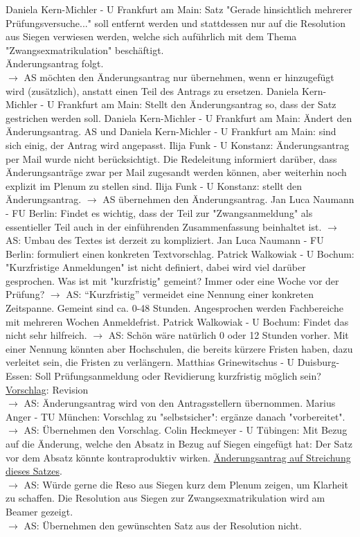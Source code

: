     \begin{outline}
      \1 Daniela Kern-Michler - U Frankfurt am Main:  Satz "Gerade hinsichtlich mehrerer Prüfungsversuche..." soll entfernt werden und stattdessen nur auf die Resolution aus Siegen verwiesen werden, welche sich auführlich mit dem Thema "Zwangsexmatrikulation" beschäftigt. \\ Änderungsantrag folgt. \\
      $\rightarrow$ AS möchten den Änderungsantrag nur übernehmen, wenn er hinzugefügt wird (zusätzlich), anstatt einen Teil des Antrags zu ersetzen.
        \2 Daniela Kern-Michler - U Frankfurt am Main:  Stellt den Änderungsantrag so, dass der Satz gestrichen werden soll.
        \2 Daniela Kern-Michler - U Frankfurt am Main:  Ändert den Änderungsantrag. AS und Daniela Kern-Michler - U Frankfurt am Main:  sind sich einig, der Antrag wird angepasst.
      \1 Ilija Funk - U Konstanz:  Änderungsantrag per Mail wurde nicht berücksichtigt.
        \2 Die Redeleitung informiert darüber, dass Änderungsanträge zwar per Mail zugesandt werden können, aber weiterhin noch explizit im Plenum zu stellen sind.
      \1 Ilija Funk - U Konstanz:  stellt den Änderungsantrag. $\rightarrow$ AS übernehmen den Änderungsantrag.
      \1 Jan Luca Naumann - FU Berlin:  Findet es wichtig, dass der Teil zur "Zwangsanmeldung" als essentieller Teil auch in der einführenden Zusammenfassung beinhaltet ist.
        $\rightarrow$ AS: Umbau des Textes ist derzeit zu kompliziert.
        \2 Jan Luca Naumann - FU Berlin:  formuliert einen konkreten Textvorschlag.
      \1 Patrick Walkowiak - U Bochum:  "Kurzfristige Anmeldungen" ist nicht definiert, dabei wird viel darüber gesprochen. Was ist mit "kurzfristig" gemeint? Immer oder eine Woche vor der Prüfung? $\rightarrow$ AS: ``Kurzfristig'' vermeidet eine Nennung einer konkreten Zeitspanne. Gemeint sind ca. 0-48 Stunden. Angesprochen werden Fachbereiche mit mehreren Wochen Anmeldefrist.
        \2 Patrick Walkowiak - U Bochum:  Findet das nicht sehr hilfreich.
          $\rightarrow$ AS: Schön wäre natürlich 0 oder 12 Stunden vorher. Mit einer Nennung könnten aber Hochschulen, die bereits kürzere Fristen haben, dazu verleitet sein, die Fristen zu verlängern.
      \1 Matthias Grinewitschus - U Duisburg-Essen:  Soll Prüfungsanmeldung oder Revidierung kurzfristig möglich sein? \uline{Vorschlag}: Revision \\
        $\rightarrow$ AS: Änderungsantrag wird von den Antragsstellern übernommen.
      \1 Marius Anger - TU München:  Vorschlag zu "selbstsicher": ergänze danach "vorbereitet". $\rightarrow$ AS: Übernehmen den Vorschlag.
      \1 Colin Heckmeyer - U Tübingen:  Mit Bezug auf die Änderung, welche den Absatz in Bezug auf Siegen eingefügt hat: Der Satz vor dem Absatz könnte kontraproduktiv wirken. \uline{Änderungsantrag auf Streichung dieses Satzes}. \\
      $\rightarrow$ AS: Würde gerne die Reso aus Siegen kurz dem Plenum zeigen, um Klarheit zu schaffen.
      \1 Die Resolution aus Siegen zur Zwangsexmatrikulation wird am Beamer gezeigt. \\
      $\rightarrow$ AS: Übernehmen den gewünschten Satz aus der Resolution nicht.
    \end{outline}

